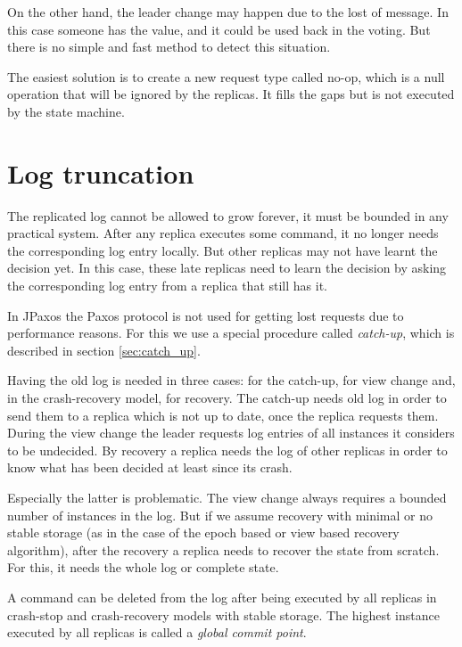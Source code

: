 On the other hand, the leader change may happen due to the lost of \alive message. In this case someone has the value, and it could be used back in the voting. But there is no simple and fast method to detect this situation.

The easiest solution is to create a new request type called no-op, which is a null operation that will be ignored by the replicas. It fills the gaps but is not executed by the state machine.

\section{Log truncation}

The replicated log cannot be allowed to grow forever, it must be bounded in any practical system. After any replica executes some command, it no longer needs the corresponding log entry locally. But other replicas may not have learnt the decision yet. In this case, these late replicas need to learn the decision by asking the corresponding log entry from a replica that still has it.

In JPaxos the Paxos protocol is not used for getting lost requests due to performance reasons. For this we use a special procedure called \textit{catch-up}, which is described in section \ref{sec:catch_up}.

Having the old log is needed in three cases: for the catch-up, for view change and, in the crash-recovery model, for recovery.
The catch-up needs old log in order to send them to a replica which is not up to date, once the replica requests them.
During the view change the leader requests log entries of all instances it considers to be undecided.
By recovery a replica needs the log of other replicas in order to know what has been decided at least since its crash.

Especially the latter is problematic. The view change always requires a bounded number of instances in the log. But if we assume recovery with minimal or no stable storage (as in the case of the epoch based or view based recovery algorithm), after the recovery a replica needs to recover the state from scratch. For this, it needs the whole log or complete state.


A command can be deleted from the log after being executed by all replicas in crash-stop and crash-recovery models with stable storage. The highest instance executed by all replicas is called a \emph{global commit point}.

